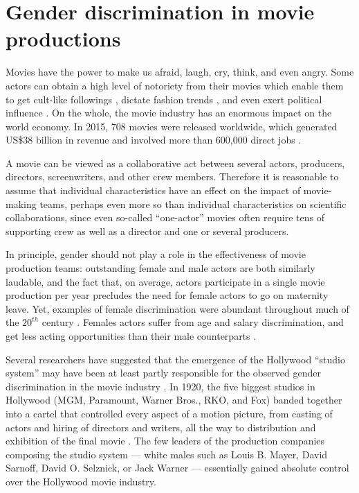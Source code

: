 \section{Gender discrimination in movie productions}

Movies have the power to make us afraid, laugh, cry, think, and even angry. Some actors can obtain a high level of notoriety from their movies which enable them to get cult-like followings \cite{Egan2013}, dictate fashion trends \cite{Berry2002}, and even exert political influence \cite{Nownes2012}. On the whole, the movie industry has an enormous impact on the world economy. In 2015, 708 movies were released worldwide, which generated US\$38 billion in revenue \cite{MPAA2015} and involved more than 600,000 direct jobs \cite{MPAA2017}.

A movie can be viewed as a collaborative act between several actors, producers, directors, screenwriters, and other crew members. Therefore it is reasonable to assume that individual characteristics have an effect on the impact of movie-making teams, perhaps even more so than individual characteristics on scientific collaborations, since even so-called ``one-actor'' movies often require tens of supporting crew as well as a director and one or several producers.

In principle, gender should not play a role in the effectiveness of movie production teams: outstanding female and male actors are both similarly laudable, and the fact that, on average, actors participate in a single movie production per year precludes the need for female actors to go on maternity leave. Yet, examples of female discrimination were abundant throughout much of the $20^{th}$ century \cite{Smith2014,Smith2017}. Females actors suffer from age \cite{Bazzini1997,Lincoln2004} and salary \cite{DePater2014} discrimination, and get less acting opportunities than their male counterparts \cite{Dean2008,Lutter2013}.

Several researchers have suggested that the emergence of the Hollywood ``studio system'' may have been at least partly responsible for the observed gender discrimination in the movie industry \cite{Lincoln2004,Smith-Doerr2010,Narayan2016,DePater2014}. In 1920, the five biggest studios in Hollywood (MGM, Paramount, Warner Bros., RKO, and Fox) banded together into a cartel that controlled every aspect of a motion picture, from casting of actors and hiring of directors and writers, all the way to distribution and exhibition of the final movie \cite{Deutelbaum1989}. The few leaders of the production companies composing the studio system --- white males such as Louis B. Mayer, David Sarnoff, David O. Selznick, or Jack Warner --- essentially gained absolute control over the Hollywood movie industry.

